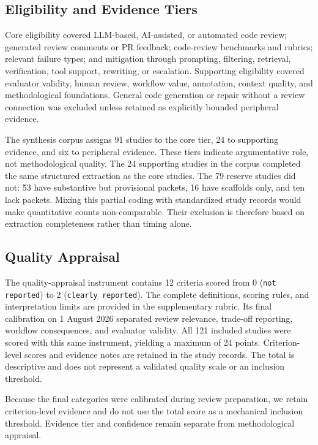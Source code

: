 \documentclass[10pt]{article}
\begin{document}
\subsection{Eligibility and Evidence Tiers}

Core eligibility covered LLM-based, AI-assisted, or automated code review; generated review comments or PR feedback; code-review benchmarks and rubrics; relevant failure types; and mitigation through prompting, filtering, retrieval, verification, tool support, rewriting, or escalation. Supporting eligibility covered evaluator validity, human review, workflow value, annotation, context quality, and methodological foundations. General code generation or repair without a review connection was excluded unless retained as explicitly bounded peripheral evidence.

The synthesis corpus assigns 91 studies to the core tier, 24 to supporting evidence, and six to peripheral evidence. These tiers indicate argumentative role, not methodological quality. The 24 supporting studies in the corpus completed the same structured extraction as the core studies. The 79 reserve studies did not: 53 have substantive but provisional packets, 16 have scaffolds only, and ten lack packets. Mixing this partial coding with standardized study records would make quantitative counts non-comparable. Their exclusion is therefore based on extraction completeness rather than timing alone.

\subsection{Quality Appraisal}

The quality-appraisal instrument contains 12 criteria scored from 0 (\texttt{not reported}) to 2 (\texttt{clearly reported}). The complete definitions, scoring rules, and interpretation limits are provided in the supplementary rubric. Its final calibration on 1 August 2026 separated review relevance, trade-off reporting, workflow consequences, and evaluator validity. All 121 included studies were scored with this same instrument, yielding a maximum of 24 points. Criterion-level scores and evidence notes are retained in the study records. The total is descriptive and does not represent a validated quality scale or an inclusion threshold.

Because the final categories were calibrated during review preparation, we retain criterion-level evidence and do not use the total score as a mechanical inclusion threshold. Evidence tier and confidence remain separate from methodological appraisal.
\end{document}
